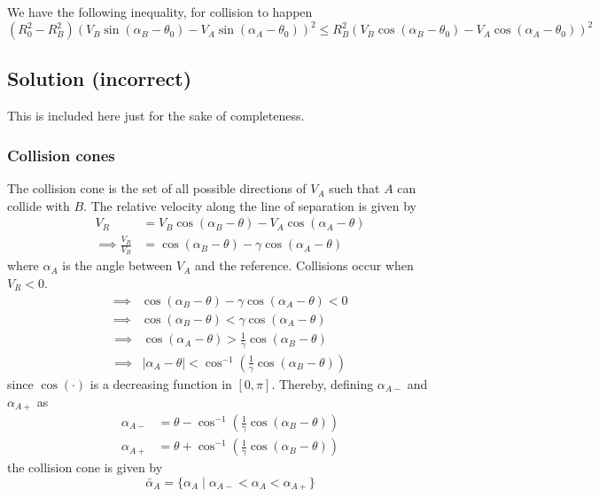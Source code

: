We have the following inequality, for collision to happen
\begin{equation*}
      \boxed{ (R_0^2 - R_B^2) {(V_B \sin (\alpha_B - \theta_0) - V_A \sin (\alpha_A - \theta_0))}^2 \leq R_B^2 {(V_B \cos (\alpha_B - \theta_0) - V_A \cos (\alpha_A - \theta_0))}^2 }
\end{equation*}

\clearpage
\subsection*{Solution (incorrect)}

This is included here just for the sake of completeness.

\subsubsection*{Collision cones}

The collision cone is the set of all possible directions of \( V_A \) such that \( A \) can collide with \( B \).
The relative velocity along the line of separation is given by
\begin{align*}
      V_{R}
       & =
      V_B \cos (\alpha_B - \theta) - V_A \cos (\alpha_A - \theta)
      \\
      \implies
      \frac{V_R}{V_B}
       & =
      \cos (\alpha_B - \theta) - \gamma \cos (\alpha_A - \theta)
\end{align*}
where \( \alpha_A \) is the angle between \( V_A \) and the reference.
Collisions occur when \( V_R < 0 \).
\begin{align*}
      \implies &
      \cos (\alpha_B - \theta) - \gamma \cos (\alpha_A - \theta) < 0
      \\ \implies &
      \cos (\alpha_B - \theta) < \gamma \cos (\alpha_A - \theta)
\end{align*}
\begin{align*}
      \implies &
      \cos (\alpha_A - \theta) > \frac{1}{\gamma} \cos (\alpha_B - \theta)
      \\ \implies &
      \vert \alpha_A - \theta \vert < \cos^{-1} \left( \frac{1}{\gamma} \cos (\alpha_B - \theta) \right)
\end{align*}
since \( \cos(\cdot) \) is a decreasing function in \( [0, \pi] \). Thereby, defining \( \alpha_{A -} \) and \( \alpha_{A +} \) as
\begin{equation*}
      \boxed{
            \begin{aligned}
                  \alpha_{A -}
                   & =
                  \theta - \cos^{-1} \left( \frac{1}{\gamma} \cos (\alpha_B - \theta) \right)
                  \\
                  \alpha_{A +}
                   & =
                  \theta + \cos^{-1} \left( \frac{1}{\gamma} \cos (\alpha_B - \theta) \right)
            \end{aligned}
      }
\end{equation*}
the collision cone is given by
\begin{equation*}
      \boxed{
            \bar \alpha_A = \{ \alpha_A \mid \alpha_{A -} < \alpha_A < \alpha_{A +} \}
      }
\end{equation*}

